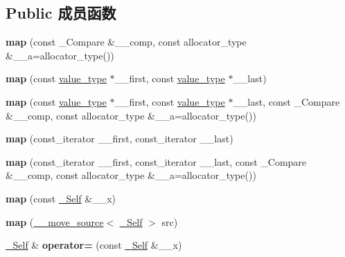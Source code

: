 \subsection*{Public 成员函数}
\begin{DoxyCompactItemize}
\item 
\mbox{\label{classmap_ab39e8dc42c51faa87e559297e8a6ca29}} 
{\bfseries map} (const \+\_\+\+Compare \&\+\_\+\+\_\+comp, const allocator\+\_\+type \&\+\_\+\+\_\+a=allocator\+\_\+type())
\item 
\mbox{\label{classmap_a694395d3287a3ff78deb86c380eb81fd}} 
{\bfseries map} (const \hyperlink{structpair}{value\+\_\+type} $\ast$\+\_\+\+\_\+first, const \hyperlink{structpair}{value\+\_\+type} $\ast$\+\_\+\+\_\+last)
\item 
\mbox{\label{classmap_ad815a6e079158bbcb7a1f675f5c2670f}} 
{\bfseries map} (const \hyperlink{structpair}{value\+\_\+type} $\ast$\+\_\+\+\_\+first, const \hyperlink{structpair}{value\+\_\+type} $\ast$\+\_\+\+\_\+last, const \+\_\+\+Compare \&\+\_\+\+\_\+comp, const allocator\+\_\+type \&\+\_\+\+\_\+a=allocator\+\_\+type())
\item 
\mbox{\label{classmap_abc976dcfcaed1b6fa6b41639c429373f}} 
{\bfseries map} (const\+\_\+iterator \+\_\+\+\_\+first, const\+\_\+iterator \+\_\+\+\_\+last)
\item 
\mbox{\label{classmap_a2e1ef87f24287c31d954d4c797372348}} 
{\bfseries map} (const\+\_\+iterator \+\_\+\+\_\+first, const\+\_\+iterator \+\_\+\+\_\+last, const \+\_\+\+Compare \&\+\_\+\+\_\+comp, const allocator\+\_\+type \&\+\_\+\+\_\+a=allocator\+\_\+type())
\item 
\mbox{\label{classmap_acf44db92ce74680b0bd2822c020c8d94}} 
{\bfseries map} (const \hyperlink{classmap}{\+\_\+\+Self} \&\+\_\+\+\_\+x)
\item 
\mbox{\label{classmap_a24a349d4b66d0a38230dac0513901d71}} 
{\bfseries map} (\hyperlink{class____move__source}{\+\_\+\+\_\+move\+\_\+source}$<$ \hyperlink{classmap}{\+\_\+\+Self} $>$ src)
\item 
\mbox{\label{classmap_add44711a9445573319bebd998af43e2c}} 
\hyperlink{classmap}{\+\_\+\+Self} \& {\bfseries operator=} (const \hyperlink{classmap}{\+\_\+\+Self} \&\+\_\+\+\_\+x)

\end{DoxyCompactItemize}
